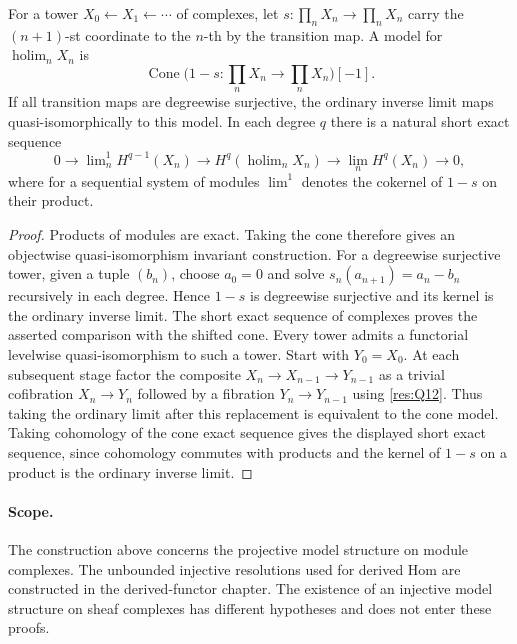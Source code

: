 \begin{theorem}\label{res:Q17}
For a tower \(X_0\leftarrow X_1\leftarrow\cdots\) of
complexes, let \(s:\prod_n X_n\to\prod_n X_n\) carry the
\((n+1)\)-st coordinate to the \(n\)-th by the transition map.
A model for \(\operatorname{holim}_n X_n\) is
\[
 \operatorname{Cone}\bigl(1-s:\prod_n X_n\to\prod_n X_n\bigr)[-1].
\]
If all transition maps are degreewise surjective, the
ordinary inverse limit maps quasi-isomorphically to this
model. In each degree \(q\) there is a natural short
exact sequence
\[
 0\longrightarrow\lim\nolimits^1_n H^{q-1}(X_n)
 \longrightarrow H^q(\operatorname{holim}_n X_n)
 \longrightarrow\lim_n H^q(X_n)\longrightarrow0 ,
\]
where for a sequential system of modules
\(\lim^1\) denotes the cokernel of \(1-s\) on their product.
\end{theorem}
\begin{proof}
Products of modules are exact. Taking the cone therefore
gives an objectwise quasi-isomorphism invariant construction.
For a degreewise surjective tower, given a tuple \((b_n)\),
choose \(a_0=0\) and solve
\(s_n(a_{n+1})=a_n-b_n\) recursively in each degree.
Hence \(1-s\) is degreewise surjective and its kernel
is the ordinary inverse limit. The short exact sequence
of complexes proves the asserted comparison with the shifted
cone. Every tower admits a functorial levelwise
quasi-isomorphism to such a tower. Start with
\(Y_0=X_0\). At each subsequent stage factor the composite
\(X_n\to X_{n-1}\to Y_{n-1}\) as a trivial cofibration
\(X_n\to Y_n\) followed by a fibration \(Y_n\to Y_{n-1}\)
using \ref{res:Q12}. Thus taking the ordinary limit
after this replacement is equivalent to the cone model.
Taking cohomology of the cone exact sequence gives the
displayed short exact sequence, since cohomology commutes
with products and the kernel of \(1-s\) on a product
is the ordinary inverse limit.
\end{proof}

\paragraph{Scope.}
The construction above concerns the projective model structure on
module complexes. The unbounded injective resolutions used for
derived Hom are constructed in the derived-functor chapter. The
existence of an injective model structure on sheaf complexes has
different hypotheses and does not enter these proofs.
